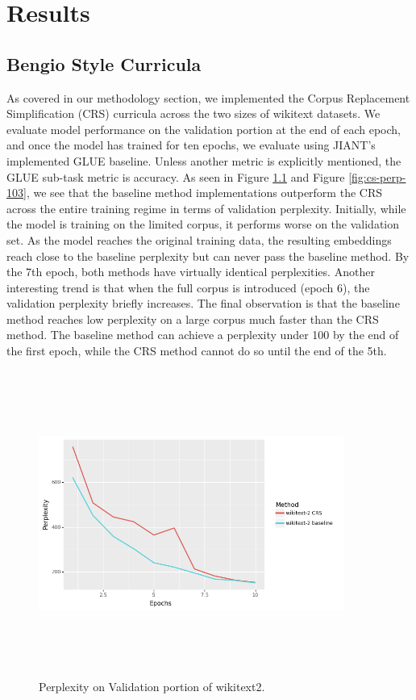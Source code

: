 \chapter{Results}
\label{chap:results}
\section{Bengio Style Curricula}
\label{chap:results:secBS}
As covered in our methodology section, we implemented the Corpus Replacement Simplification (CRS) curricula across the two sizes of wikitext datasets. We evaluate model performance on the validation portion at the end of each epoch, and once the model has trained for ten epochs, we evaluate using JIANT's \cite{Pruksachatkun2020jiantAS} implemented GLUE baseline. Unless another metric is explicitly mentioned, the GLUE sub-task metric is accuracy.
As seen in Figure \ref{fig:cs-perp-2} and Figure \ref{fig:cs-perp-103}, we see that the baseline method implementations outperform the CRS across the entire training regime in terms of validation perplexity. Initially, while the model is training on the limited corpus, it performs worse on the validation set. As the model reaches the original training data, the resulting embeddings reach close to the baseline perplexity but can never pass the baseline method. By the 7th epoch, both methods have virtually identical perplexities. Another interesting trend is that when the full corpus is introduced (epoch 6), the validation perplexity briefly increases. The final observation is that the baseline method reaches low perplexity on a large corpus much faster than the CRS method. The baseline method can achieve a perplexity under 100 by the end of the first epoch, while the CRS method cannot do so until the end of the 5th. \\
\begin{figure}[h]
\centering
\includegraphics[width=10cm, height=10cm]{Thesis/images/wikitext-2BS.png}
\caption{Perplexity on Validation portion of wikitext2.}
\label{fig:cs-perp-2}
\end{figure}
